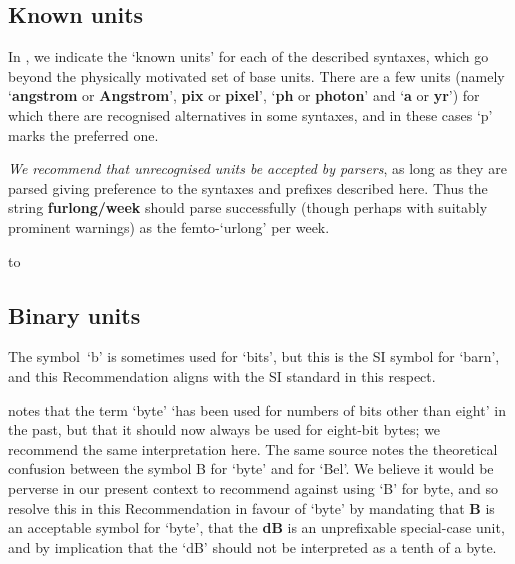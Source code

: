 \documentclass[11pt,notitlepage,onecolumn]{ivoa}
\makeatletter
\def\units{\@ifstar{\let\un@tsspace\relax    \un@ts}%
                   {\let\un@tsspace\thinspace\un@ts}}
\newcommand{\un@ts}[1]{{\let~\thinspace
  \ifmmode
    \un@tsspace\mathrm{#1}%
  \else
    \nobreak$\un@tsspace\mathrm{#1}$%
  \fi}}
\newcommand{\unit}[1]{\textbf{\textsf{\color{orange}#1}}}
\makeatother
\begin{document}
\subsection{Known units}
\label{sec:knownunits}

In , we indicate the `known units' for each of the
described syntaxes, which go beyond the physically motivated set of
base units.
There are a few units (namely `\unit{angstrom} or \unit{Angstrom}', 
\unit{pix} or \unit{pixel}', `\unit{ph} or \unit{photon}' and `\unit{a} or \unit{yr}') for
which there are recognised alternatives in some syntaxes, and in these
cases `p' marks the preferred one.

\emph{We recommend that unrecognised units be accepted by parsers},
as long as they are parsed giving preference to the syntaxes and prefixes described here.
Thus the string \unit{furlong/week} should parse successfully (though
perhaps with suitably prominent warnings) as the femto-`urlong' per week.

\begin{table}
\hbox to 
\caption[Known units in the various syntaxes]
{\label{tabx:knownunits}Known units in the various syntaxes.
In the table, a `$\cdot$' indicates that the unit is recognised in that syntax,
an~`s' that it it additionally permitted to have SI prefixes,
a~`b' that it is permitted to have binary prefixes,
and a `d' that it is recognised but deprecated.
For those units which have alternative symbols, a~`p' indicates the
preferred one.}
\end{table}

\subsection{Binary units}

The symbol~`b' is sometimes used for `bits', but this is the SI symbol
for `barn', and this Recommendation aligns with the SI standard in
this respect.

\citet[item 13-9.c]{std:iec80000-13} notes that the term `byte'
`has been used for numbers of bits other than eight' in the past, but
that it should now always be used for eight-bit bytes; we recommend
the same interpretation here.  The same source notes the theoretical
confusion between the symbol \units{B} for `byte' and for `Bel'.  We
believe it would be perverse in our present context to recommend
against using `B' for byte, and so resolve this in this Recommendation
in favour of `byte' by mandating that \unit{B} is an
acceptable symbol for `byte', that the \unit{dB} is an
unprefixable special-case unit, and by implication that the `dB'
should not be interpreted as a tenth of a byte.
\end{document}
